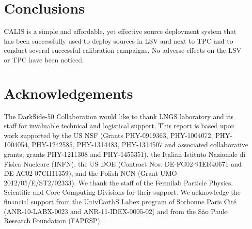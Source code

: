 \section{Conclusions}\label{sec:Conclusions}\label{sec:Conclusion}
CALIS is a simple and affordable, yet effective source deployment system that has been successfully used to deploy sources in LSV and next to TPC and to conduct several successful calibration campaigns. No adverse effects on the LSV or TPC have been noticed.



\section{Acknowledgements}\label{sec:Acknowledgements}
The DarkSide-50 Collaboration would like to thank LNGS laboratory and its staff for invaluable technical and logistical support. This report is based upon work supported by the US NSF (Grants PHY-0919363, PHY-1004072, PHY-1004054, PHY-1242585, PHY-1314483, PHY-1314507 and associated collaborative grants; grants PHY-1211308 and PHY-1455351), the Italian Istituto Nazionale di Fisica Nucleare (INFN), the US DOE (Contract Nos. DE-FG02-91ER40671 and DE-AC02-07CH11359), and the Polish NCN (Grant UMO-2012/05/E/ST2/02333). We thank the staff of the Fermilab Particle Physics, Scientific and Core Computing Divisions for their support. We acknowledge the financial support from the UnivEarthS Labex program of Sorbonne Paris Cit\'{e} (ANR-10-LABX-0023 and ANR-11-IDEX-0005-02) and from the S\~{a}o Paulo Research Foundation (FAPESP).